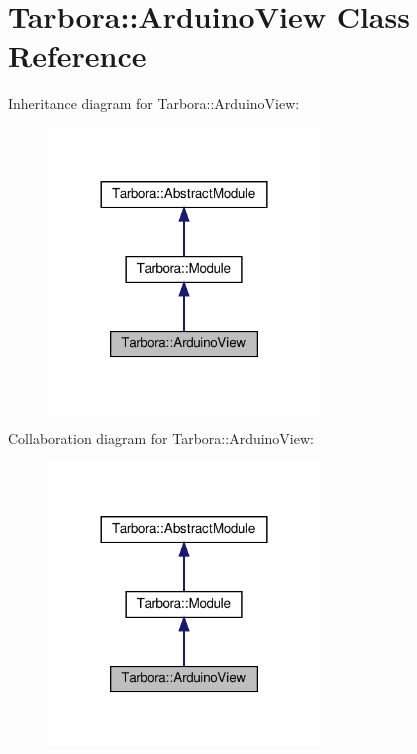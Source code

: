 \hypertarget{classTarbora_1_1ArduinoView}{}\section{Tarbora\+:\+:Arduino\+View Class Reference}
\label{classTarbora_1_1ArduinoView}


Inheritance diagram for Tarbora\+:\+:Arduino\+View\+:\nopagebreak
\begin{figure}[H]
\begin{center}
\leavevmode
\includegraphics[width=204pt]{classTarbora_1_1ArduinoView__inherit__graph}
\end{center}
\end{figure}


Collaboration diagram for Tarbora\+:\+:Arduino\+View\+:\nopagebreak
\begin{figure}[H]
\begin{center}
\leavevmode
\includegraphics[width=204pt]{classTarbora_1_1ArduinoView__coll__graph}
\end{center}
\end{figure}
